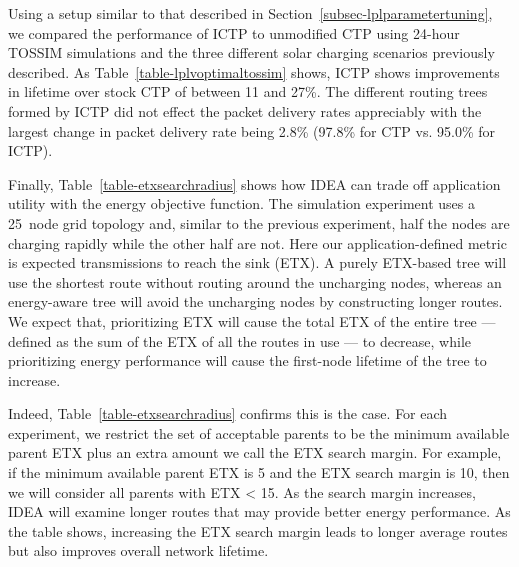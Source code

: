 Using a setup similar to that described in
Section~\ref{subsec-lplparametertuning}, we compared the performance of ICTP
to unmodified CTP using 24-hour TOSSIM simulations and the three different
solar charging scenarios previously described. As
Table~\ref{table-lplvoptimaltossim} shows, ICTP shows improvements in
lifetime over stock CTP of between 11 and 27\%. The different routing trees
formed by ICTP did not effect the packet delivery rates appreciably with the
largest change in packet delivery rate being 2.8\% (97.8\% for CTP vs. 95.0\%
for ICTP).

Finally, Table~\ref{table-etxsearchradius} shows how IDEA can trade off
application utility with the energy objective function. The simulation
experiment uses a 25~node grid topology and, similar to the previous
experiment, half the nodes are charging rapidly while the other half are not.
Here our application-defined metric is expected transmissions to reach the
sink (ETX). A purely ETX-based tree will use the shortest route without
routing around the uncharging nodes, whereas an energy-aware tree will avoid
the uncharging nodes by constructing longer routes. We expect that,
prioritizing ETX will cause the total ETX of the entire tree --- defined as
the sum of the ETX of all the routes in use --- to decrease, while
prioritizing energy performance will cause the first-node lifetime of the
tree to increase.

Indeed, Table~\ref{table-etxsearchradius} confirms this is the case. For each
experiment, we restrict the set of acceptable parents to be the minimum
available parent ETX plus an extra amount we call the ETX search
margin. For example, if the minimum available parent ETX is 5 and the ETX
search margin is 10, then we will consider all parents with ETX < 15. As the
search margin increases, IDEA will examine longer routes that may provide
better energy performance. As the table shows, increasing the ETX search
margin leads to longer average routes but also improves overall network
lifetime.


